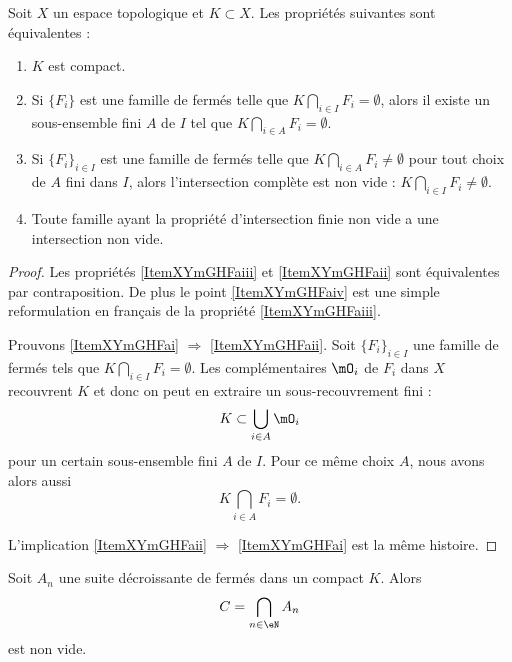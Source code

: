 \begin{proposition}\label{PropXKUMiCj}
    Soit \( X\) un espace topologique et \( K\subset X\). Les propriétés suivantes sont équivalentes :
    \begin{enumerate}
        \item\label{ItemXYmGHFai}
            \( K\) est compact.
        \item\label{ItemXYmGHFaii}
            Si \( \{ F_i \}\) est une famille de fermés telle que \( K\bigcap_{i\in I}F_i=\emptyset\), alors il existe un sous-ensemble fini \( A\) de \( I\) tel que \( K\bigcap_{i\in A}F_i=\emptyset\).
        \item\label{ItemXYmGHFaiii}
            Si \( \{ F_i \}_{i\in I}\) est une famille de fermés telle que \( K\bigcap_{i\in A}F_i\neq\emptyset\) pour tout choix de \( A\) fini dans \( I\), alors l'intersection complète est non vide : \( K\bigcap_{i\in I}F_i\neq\emptyset\).
        \item\label{ItemXYmGHFaiv}
            Toute famille ayant la propriété d'intersection finie non vide a une intersection non vide.
    \end{enumerate}
\end{proposition}

\begin{proof}
    Les propriétés \ref{ItemXYmGHFaiii} et \ref{ItemXYmGHFaii} sont équivalentes par contraposition. De plus le point \ref{ItemXYmGHFaiv} est une simple reformulation en français de la propriété \ref{ItemXYmGHFaiii}.

    Prouvons \ref{ItemXYmGHFai} \( \Rightarrow\) \ref{ItemXYmGHFaii}. Soit \( \{ F_i \}_{i\in I}\) une famille de fermés tels que \( K\bigcap_{i\in I}F_i=\emptyset\). Les complémentaires \( \mO_i\) de \( F_i\) dans \( X\) recouvrent \( K\) et donc on peut en extraire un sous-recouvrement fini :
    \begin{equation}
        K\subset\bigcup_{i\in A}\mO_i
    \end{equation}
    pour un certain sous-ensemble fini \( A\) de \( I\). Pour ce même choix \( A\), nous avons alors aussi
    \begin{equation}
        K\bigcap_{i\in A}F_i=\emptyset.
    \end{equation}

    L'implication \ref{ItemXYmGHFaii} \( \Rightarrow\) \ref{ItemXYmGHFai} est la même histoire.
\end{proof}


\begin{lemma}       \label{LemooynkH}
    Soit \( A_n\) une suite décroissante de fermés dans un compact \( K\). Alors
    \begin{equation}
        C=\bigcap_{n\in \eN}A_n
    \end{equation}
    est non vide. 
\end{lemma}

